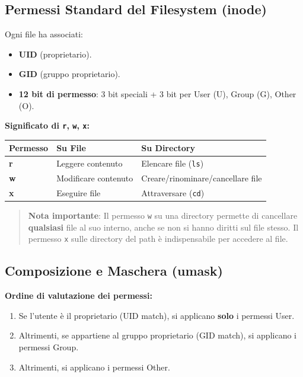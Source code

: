 \documentclass[12pt, a4paper]{report}
\begin{document}
\subsection{Permessi Standard del Filesystem (inode)}
Ogni file ha associati:
\begin{itemize}
	\item \textbf{UID} (proprietario).
	\item \textbf{GID} (gruppo proprietario).
	\item \textbf{12 bit di permesso}: 3 bit speciali + 3 bit per User (U), Group (G), Other (O).
\end{itemize}

\textbf{Significato di \texttt{r}, \texttt{w}, \texttt{x}:}

\begin{table}[H]
	\centering
	\begin{tabular}{|l|l|l|}
		\hline
		\textbf{Permesso} & \textbf{Su File} & \textbf{Su Directory} \\ \hline
		\textbf{r} & Leggere contenuto & Elencare file (\texttt{ls}) \\ \hline
		\textbf{w} & Modificare contenuto & Creare/rinominare/cancellare file \\ \hline
		\textbf{x} & Eseguire file & Attraversare (\texttt{cd}) \\ \hline
	\end{tabular}
\end{table}

\begin{quote}
	\textbf{Nota importante}: Il permesso \texttt{w} su una directory permette di cancellare \textbf{qualsiasi} file al suo interno, anche se non si hanno diritti sul file stesso. Il permesso \texttt{x} sulle directory del path è indispensabile per accedere al file.
\end{quote}

\subsection{Composizione e Maschera (umask)}
\textbf{Ordine di valutazione dei permessi:}
\begin{enumerate}
	\item Se l'utente è il proprietario (UID match), si applicano \textbf{solo} i permessi User.
	\item Altrimenti, se appartiene al gruppo proprietario (GID match), si applicano i permessi Group.
	\item Altrimenti, si applicano i permessi Other.
\end{enumerate}
\end{document}
